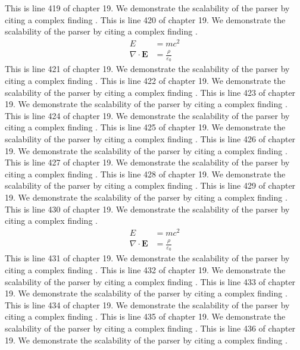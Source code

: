 This is line 419 of chapter 19. We demonstrate the scalability of the parser by citing a complex finding \cite{ref19_419}.
This is line 420 of chapter 19. We demonstrate the scalability of the parser by citing a complex finding \cite{ref19_420}.
\begin{align*}
  E &= mc^2 \\
  \nabla \cdot \mathbf{E} &= \frac{\rho}{\varepsilon_0}
\end{align*}
This is line 421 of chapter 19. We demonstrate the scalability of the parser by citing a complex finding \cite{ref19_421}.
This is line 422 of chapter 19. We demonstrate the scalability of the parser by citing a complex finding \cite{ref19_422}.
This is line 423 of chapter 19. We demonstrate the scalability of the parser by citing a complex finding \cite{ref19_423}.
This is line 424 of chapter 19. We demonstrate the scalability of the parser by citing a complex finding \cite{ref19_424}.
This is line 425 of chapter 19. We demonstrate the scalability of the parser by citing a complex finding \cite{ref19_425}.
This is line 426 of chapter 19. We demonstrate the scalability of the parser by citing a complex finding \cite{ref19_426}.
This is line 427 of chapter 19. We demonstrate the scalability of the parser by citing a complex finding \cite{ref19_427}.
This is line 428 of chapter 19. We demonstrate the scalability of the parser by citing a complex finding \cite{ref19_428}.
This is line 429 of chapter 19. We demonstrate the scalability of the parser by citing a complex finding \cite{ref19_429}.
This is line 430 of chapter 19. We demonstrate the scalability of the parser by citing a complex finding \cite{ref19_430}.
\begin{align*}
  E &= mc^2 \\
  \nabla \cdot \mathbf{E} &= \frac{\rho}{\varepsilon_0}
\end{align*}
This is line 431 of chapter 19. We demonstrate the scalability of the parser by citing a complex finding \cite{ref19_431}.
This is line 432 of chapter 19. We demonstrate the scalability of the parser by citing a complex finding \cite{ref19_432}.
This is line 433 of chapter 19. We demonstrate the scalability of the parser by citing a complex finding \cite{ref19_433}.
This is line 434 of chapter 19. We demonstrate the scalability of the parser by citing a complex finding \cite{ref19_434}.
This is line 435 of chapter 19. We demonstrate the scalability of the parser by citing a complex finding \cite{ref19_435}.
This is line 436 of chapter 19. We demonstrate the scalability of the parser by citing a complex finding \cite{ref19_436}.
